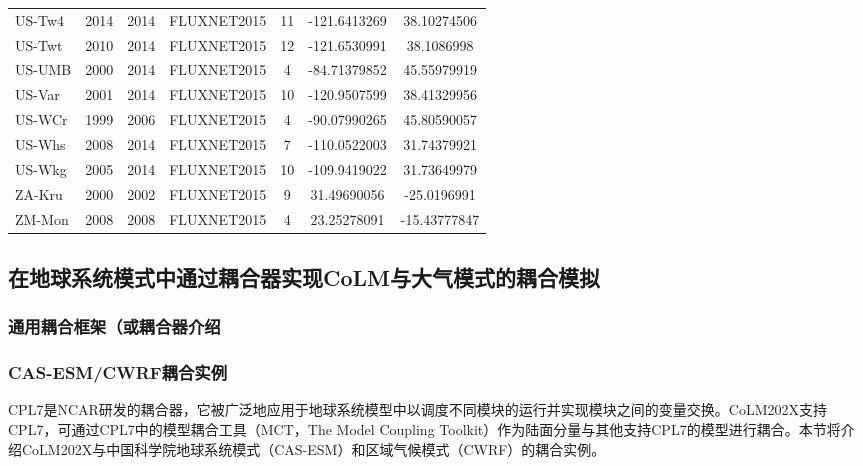 \begin{center}
\begin{longtable}{lcccccc}
US-Tw4 & 2014 & 2014 & FLUXNET2015 & 11     & -121.6413269 & 38.10274506  \\
US-Twt & 2010 & 2014 & FLUXNET2015 & 12     & -121.6530991 & 38.1086998   \\
US-UMB & 2000 & 2014 & FLUXNET2015 & 4      & -84.71379852 & 45.55979919  \\
US-Var & 2001 & 2014 & FLUXNET2015 & 10     & -120.9507599 & 38.41329956  \\
US-WCr & 1999 & 2006 & FLUXNET2015 & 4      & -90.07990265 & 45.80590057  \\
US-Whs & 2008 & 2014 & FLUXNET2015 & 7      & -110.0522003 & 31.74379921  \\
US-Wkg & 2005 & 2014 & FLUXNET2015 & 10     & -109.9419022 & 31.73649979  \\
ZA-Kru & 2000 & 2002 & FLUXNET2015 & 9      & 31.49690056  & -25.0196991  \\
ZM-Mon & 2008 & 2008 & FLUXNET2015 & 4      & 23.25278091  & -15.43777847 \\ 
\end{longtable}
\end{center}


\subsection{在地球系统模式中通过耦合器实现CoLM与大气模式的耦合模拟}
\subsubsection{通用耦合框架（或耦合器介绍}
\subsubsection{CAS-ESM/CWRF耦合实例}
CPL7是NCAR研发的耦合器，它被广泛地应用于地球系统模型中以调度不同模块的运行并实现模块之间的变量交换。CoLM202X支持CPL7，可通过CPL7中的模型耦合工具（MCT，The Model Coupling Toolkit）作为陆面分量与其他支持CPL7的模型进行耦合。本节将介绍CoLM202X与中国科学院地球系统模式（CAS-ESM）和区域气候模式（CWRF）的耦合实例。